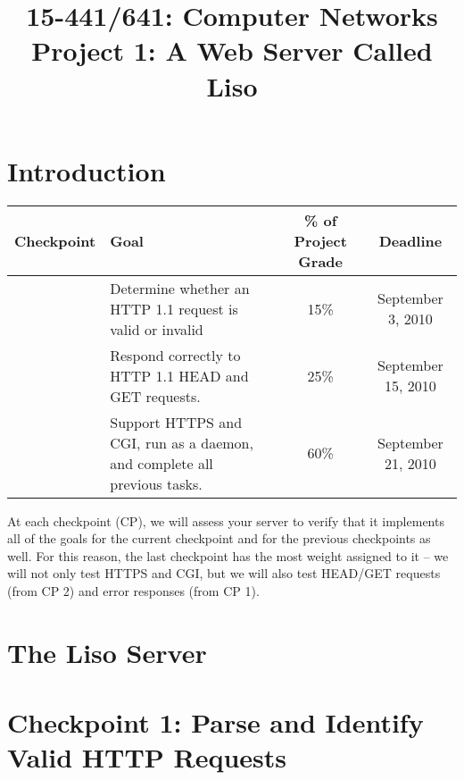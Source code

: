 \documentclass{article}
\begin{document}
\title{	15-441/641: Computer Networks\\
Project 1: A Web Server Called Liso\\
}
\date{}

\maketitle

\section{Introduction}


\begin{center}
\vspace{10pt}
\begin{tabular}{cp{2.25in}cc}
  Checkpoint&Goal&\% of Project Grade&Deadline\\
  \hline
  
  \addlinespace[5pt]
  1&Determine whether an HTTP 1.1 request is valid or invalid&15\%&September 3, 2010\\
  
  \addlinespace[5pt]
  2&Respond correctly to HTTP 1.1 HEAD and GET requests.&25\%&September 15, 2010\\
  
  \addlinespace[5pt]
  3&Support HTTPS and CGI, run as a daemon, and complete all previous tasks.&60\%&September 21, 2010\\
\end{tabular}
\end{center}

\noindent At each checkpoint (CP), we will assess your server to verify that it implements all of the goals for the current checkpoint and for the previous checkpoints as well. 
  For this reason, the last checkpoint has the most weight assigned to it -- we will not only test HTTPS and CGI, but we will also test HEAD/GET requests (from CP 2) and error responses (from CP 1).

\newpage
\section{The Liso Server}


\newpage
\section{Checkpoint 1: Parse and Identify Valid HTTP Requests}

\end{document}
